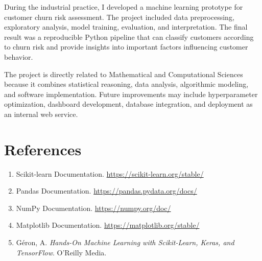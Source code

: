 \documentclass[12pt,a4paper]{article}
\begin{document}
During the industrial practice, I developed a machine learning prototype for customer churn risk assessment. The project included data preprocessing, exploratory analysis, model training, evaluation, and interpretation. The final result was a reproducible Python pipeline that can classify customers according to churn risk and provide insights into important factors influencing customer behavior.

The project is directly related to Mathematical and Computational Sciences because it combines statistical reasoning, data analysis, algorithmic modeling, and software implementation. Future improvements may include hyperparameter optimization, dashboard development, database integration, and deployment as an internal web service.

\section{References}

\begin{enumerate}
    \item Scikit-learn Documentation. \url{https://scikit-learn.org/stable/}
    \item Pandas Documentation. \url{https://pandas.pydata.org/docs/}
    \item NumPy Documentation. \url{https://numpy.org/doc/}
    \item Matplotlib Documentation. \url{https://matplotlib.org/stable/}
    \item Géron, A. \textit{Hands-On Machine Learning with Scikit-Learn, Keras, and TensorFlow}. O'Reilly Media.
\end{enumerate}
\end{document}
